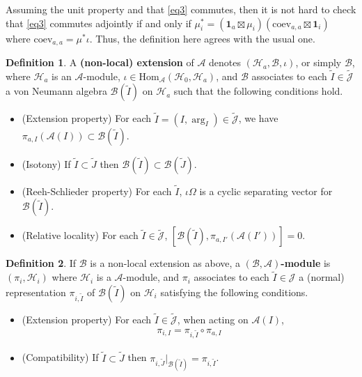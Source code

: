 \documentclass[12pt,a4paper,notitlepage]{article}
\theoremstyle{definition}
\newtheorem{df}{Definition}[section]
\theoremstyle{plain}
\newcommand{\mc}{\mathcal}
\newcommand{\wtd}{\widetilde}
\newcommand{\id}{\mathbf{1}}
\newcommand{\Hom}{\mathrm{Hom}}
\newcommand{\coev}{\mathrm{coev}}
\newcommand{\Jtd}{\widetilde{\mathcal J}}
\numberwithin{equation}{section}
\begin{document}
Assuming the unit property and that \eqref{eq3} commutes, then it is not hard to check that \eqref{eq3} commutes adjointly if and only if $\mu_i^*=(\id_a\boxtimes\mu_i)(\coev_{a,a}\boxtimes\id_i)$ where $\coev_{a,a}=\mu^*\iota$. Thus, the definition here agrees with the usual one.

	
\begin{df}\label{lb16}
A \textbf{(non-local) extension} of $\mc A$ denotes $(\mc H_a,\mc B,\iota)$, or simply $\mc B$, where $\mc H_a$ is an $\mc A$-module, $\iota\in\Hom_{\mc A}(\mc H_0,\mc H_a)$, and $\mc B$ associates to each $\wtd I\in\Jtd$ a von Neumann algebra $\mc B(\wtd I)$ on $\mc H_a$ such that the following conditions hold.
\begin{itemize}
\item (Extension property) For each $\wtd I=(I,\arg_I)\in\Jtd$, we have $\pi_{a,I}(\mc A(I))\subset\mc B(\wtd I)$.
\item (Isotony) If $\wtd I\subset\wtd J$ then $\mc B(\wtd I)\subset\mc B(\wtd J)$.
\item (Reeh-Schlieder property) For each $\wtd I$, $\iota\Omega$ is a cyclic separating vector for $\mc B(\wtd I)$.
\item (Relative locality) For each $\wtd I\in\Jtd$, $[\mc B(\wtd I),\pi_{a,I'}(\mc A(I'))]=0$.
\end{itemize}
\end{df}

	
\begin{df}\label{lb7}
If $\mc B$ is a non-local extension as above, a \textbf{$(\mc B,\mc A)$-module} is $(\pi_i,\mc H_i)$ where $\mc H_i$ is a $\mc A$-module, and $\pi_i$ associates to each $\wtd I\in\mc J$ a (normal) representation $\pi_{i,\wtd I}$ of $\mc B(\wtd I)$ on $\mc H_i$ satisfying the following conditions.
\begin{itemize}
\item (Extension property) For each $\wtd I\in\Jtd$, when acting on $\mc A(I)$,
\begin{align}
\pi_{i,I}=\pi_{i,\wtd I}\circ\pi_{a,I}\label{eq6}	
\end{align}
\item (Compatibility) If $\wtd I\subset\wtd J$ then $\pi_{i,\wtd J}|_{\mc B(\wtd I)}=\pi_{i,\wtd I}$.
\end{itemize}
\end{df}
\end{document}
